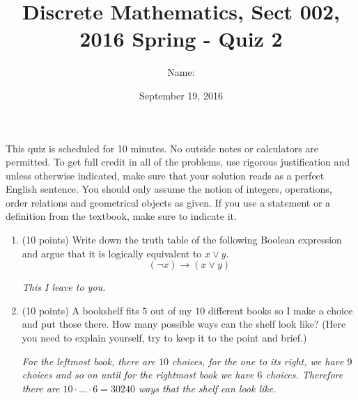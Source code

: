 \documentclass[11pt]{preprint}
\title{Discrete Mathematics, Sect 002, 2016 Spring - Quiz 2}
\author{Name:}
\institute{Courant Institute of Mathematical Sciences, NYU}
\date{September 19, 2016}
\begin{document}
\maketitle

This quiz is scheduled for 10 minutes. No outside notes or calculators are permitted. To get full credit  in all of the problems, use rigorous justification and unless otherwise indicated, make sure that your solution reads as a perfect English sentence. You should only assume the notion of integers, operations, order relations and geometrical objects as given. If you use a statement or a definition from the textbook, make sure to indicate it.
\vspace{0.2cm}



\begin{enumerate}
\item (10 points) Write down the truth table of the following Boolean expression and argue that it is logically equivalent to $x\vee y$.
\[
(\neg x)\to(x\vee y)
\]
\vspace{1cm}

\textit{This I leave to you.}

\vspace{1cm}
\item (10 points) A bookshelf fits $5$ out of my $10$ different books so I make a choice and put those there. How many possible ways can the shelf look like? (Here you need to explain yourself, try to keep it to the point and brief.)
\vspace{2cm}

\textit{For the leftmost book, there are $10$ choices, for the one to its right, we have $9$ choices and so on until for the rightmost book we have $6$ choices. Therefore there are $10\cdot...\cdot 6=30240$ ways that the shelf can look like.}

\end{enumerate}
\end{document}
